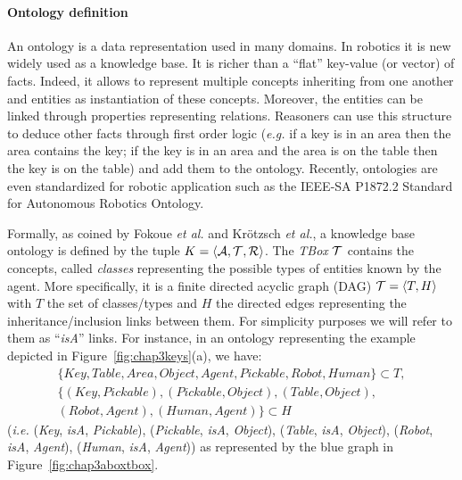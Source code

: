 \documentclass[a4paper,11pt,twoside]{StyleThese}
\begin{document}
\paragraph{Ontology definition}
An ontology is a data representation used in many domains. In robotics it is new widely used as a knowledge base. It is richer than a ``flat'' key-value (or vector) of facts. Indeed, it allows to represent multiple concepts inheriting from one another and entities as instantiation of these concepts. Moreover, the entities can be linked through properties representing relations. Reasoners can use this structure to deduce other facts through first order logic (\textit{e.g.} if a key is in an area then the area contains the key; if the key is in an area and the area is on the table then the key is on the table) and add them to the ontology. Recently, ontologies are even standardized for robotic application such as the IEEE-SA P1872.2 Standard for Autonomous Robotics Ontology.

Formally, as coined by Fokoue \textit{et al.} \cite{fokoue2006summary} and Kr\"otzsch \textit{et al.}, a knowledge base ontology is defined by the tuple $K = \langle \mathcal{A}, \mathcal{T}, \mathcal{R} \rangle$. 
The \textit{TBox} $\mathcal{T}$ contains the concepts, called \textit{classes} representing the possible types of entities known by the agent. More specifically, it is a finite directed acyclic graph (DAG) $\mathcal{T} = \langle T, H \rangle$ with $T$ the set of classes/types and $H$ the directed edges representing the inheritance/inclusion links between them. For simplicity purposes we will refer to them as ``\textit{isA}'' links. For instance, in an ontology representing the example depicted in Figure~\ref{fig:chap3keys}(a), we have: 
\begin{multline*}
\{Key, Table, Area, Object, Agent, Pickable, Robot, Human\} \subset T,\\
\{(Key, Pickable), (Pickable, Object), (Table, Object),\\
(Robot, Agent), (Human, Agent)\} \subset H
\end{multline*}
(\textit{i.e.} (\textit{Key}, \textit{isA}, \textit{Pickable}), (\textit{Pickable}, \textit{isA}, \textit{Object}), (\textit{Table}, \textit{isA}, \textit{Object}), (\textit{Robot}, \textit{isA}, \textit{Agent}), (\textit{Human}, \textit{isA}, \textit{Agent})) as represented by the blue graph in Figure~\ref{fig:chap3aboxtbox}.
\end{document}
